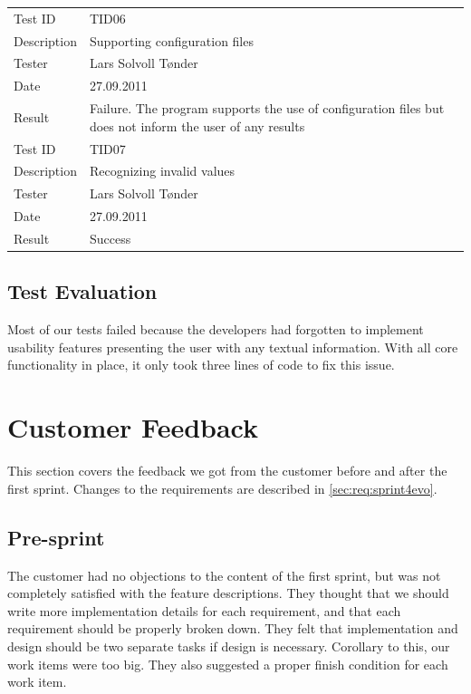 \begin{table}[htbp]
{\begin{tabularx}{\textwidth}{l X}
	\midrule
	Test ID & TID06 \\
	Description &  Supporting configuration files  \\
	Tester & Lars Solvoll Tønder \\
	Date & 27.09.2011 \\
	Result & Failure. The program supports the use of configuration files but does not inform the user of any results\\
	\midrule
	Test ID & TID07 \\
	Description &  Recognizing invalid values  \\
	Tester & Lars Solvoll Tønder \\
	Date & 27.09.2011 \\
	Result & Success\\
	\bottomrule
\end{tabularx}}
\end{table}

\subsection{Test Evaluation}
Most of our tests failed because the developers had forgotten to implement
usability features presenting the user with any textual information. With all
core functionality in place, it only took three lines of code to fix this issue.


\section{Customer Feedback}
\label{sec:sp1:feedback}
This section covers the feedback we got from the customer before and after the first sprint.
Changes to the requirements are described in \autoref{sec:req:sprint4evo}.

\subsection{Pre-sprint}
The customer had no objections to the content of the first sprint, but was not
completely satisfied with the feature descriptions. They thought that we should
write more implementation details for each requirement, and that each
requirement should be properly broken down. They felt that
implementation and design should be two separate tasks if design is necessary.
Corollary to this, our work items were too big. They also suggested a proper
finish condition for each work item.

